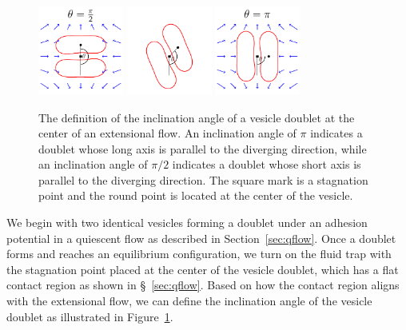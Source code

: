 \documentclass[prf,superscriptaddress,showpacs]{revtex4-1}
\begin{document}
\begin{figure}[htp]
    \includegraphics[width=0.25\textwidth]{figs/rotate1.pdf}
    \hspace{20pt}
    \includegraphics[width=0.25\textwidth]{figs/angleDefinition.pdf}
    \hspace{20pt}
    \includegraphics[width=0.25\textwidth]{figs/rotate2.pdf}
   \caption{\label{fig:InclinationAngle} The definition of the
   inclination angle of a vesicle doublet at the center of an
   extensional flow.  An inclination angle of $\pi$ indicates a doublet
   whose long axis is parallel to the diverging direction, while an
   inclination angle of $\pi/2$ indicates a doublet whose short axis is
   parallel to the diverging direction.  The square mark is a stagnation
   point and the round point is located at the center of the vesicle.}
   \end{figure}

We begin with two identical vesicles forming a doublet under an
adhesion potential in a quiescent flow as described in
Section~\ref{sec:qflow}.  Once a doublet forms and reaches an
equilibrium configuration, we turn on the fluid trap with the stagnation
point placed at the center of the vesicle doublet, which has a flat contact region as shown in \S~\ref{sec:qflow}. 
Based on how the contact region aligns with the extensional flow, 
we can define the inclination angle of the vesicle doublet as illustrated in Figure~\ref{fig:InclinationAngle}.
%
\end{document}
